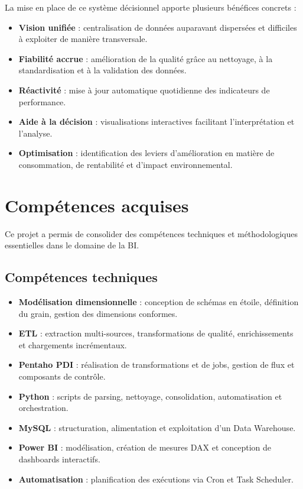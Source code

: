 \documentclass[12pt,a4paper]{report}
\begin{document}
La mise en place de ce système décisionnel apporte plusieurs bénéfices concrets :

\begin{itemize}
    \item \textbf{Vision unifiée} : centralisation de données auparavant dispersées et difficiles à exploiter de manière transversale.
    \item \textbf{Fiabilité accrue} : amélioration de la qualité grâce au nettoyage, à la standardisation et à la validation des données.
    \item \textbf{Réactivité} : mise à jour automatique quotidienne des indicateurs de performance.
    \item \textbf{Aide à la décision} : visualisations interactives facilitant l’interprétation et l’analyse.
    \item \textbf{Optimisation} : identification des leviers d’amélioration en matière de consommation, de rentabilité et d’impact environnemental.
\end{itemize}

\section{Compétences acquises}

Ce projet a permis de consolider des compétences techniques et méthodologiques essentielles dans le domaine de la BI.

\subsection{Compétences techniques}

\begin{itemize}
    \item \textbf{Modélisation dimensionnelle} : conception de schémas en étoile, définition du grain, gestion des dimensions conformes.
    \item \textbf{ETL} : extraction multi-sources, transformations de qualité, enrichissements et chargements incrémentaux.
    \item \textbf{Pentaho PDI} : réalisation de transformations et de jobs, gestion de flux et composants de contrôle.
    \item \textbf{Python} : scripts de parsing, nettoyage, consolidation, automatisation et orchestration.
    \item \textbf{MySQL} : structuration, alimentation et exploitation d’un Data Warehouse.
    \item \textbf{Power BI} : modélisation, création de mesures DAX et conception de dashboards interactifs.
    \item \textbf{Automatisation} : planification des exécutions via Cron et Task Scheduler.
\end{itemize}
\end{document}
